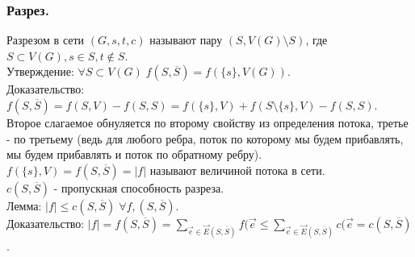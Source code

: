 \subsubsection{Разрез.}
Разрезом в сети $(G, s, t, c)$ называют пару $(S, V(G) \setminus S)$, где $S \subset V(G), s \in S, t \not\in S$.\\
Утверждение: $\forall S \subset V(G) \; f(S, \overline{S}) = f(\{s\}, V(G))$.\\
Доказательство: $f(S, \overline{S}) = f(S, V) - f(S, S) = f(\{s\}, V) + f(S \setminus \{s\}, V) - f(S, S)$.\\
Второе слагаемое обнуляется по второму свойству из определения потока, третье - по третьему (ведь для любого ребра, поток по которому мы будем прибавлять, мы будем прибавлять и поток по обратному ребру).\\
$f(\{s\}, V) = f(S, \overline{S}) = |f|$ называют величиной потока в сети.\\
$c(S, \overline{S})$ - пропускная способность разреза.\\
Лемма: $|f| \leq c(S, \overline{S}) \; \forall f, (S, \overline{S})$.\\
Доказательство: $|f| = f(S, \overline{S}) = \sum\limits_{\overrightarrow{e} \in\overrightarrow{E}(S, \overline{S})}f(\overrightarrow{e} \leq \sum\limits_{\overrightarrow{e} \in\overrightarrow{E}(S, \overline{S})}c(\overrightarrow{e} = c(S, \overline{S})$.
